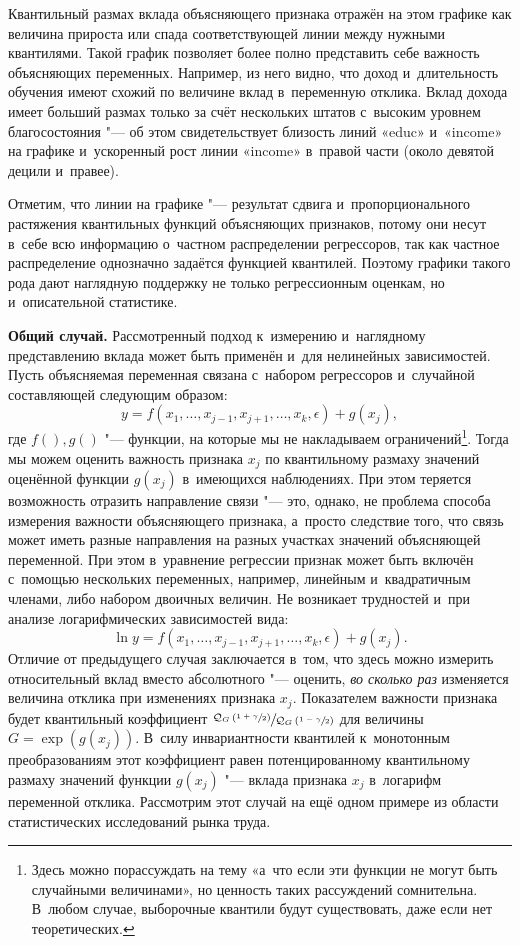\documentclass[11pt]{article}
\begin{document}
Квантильный размах вклада объясняющего признака отражён на этом графике как величина прироста или спада соответствующей линии между нужными квантилями. Такой график позволяет более полно представить себе важность объясняющих переменных. Например, из него видно, что доход и~длительность обучения имеют схожий по величине вклад в~переменную отклика. Вклад дохода имеет больший размах только за счёт нескольких штатов с~высоким уровнем благосостояния "--- об этом свидетельствует близость линий «educ» и~«income» на графике и~ускоренный рост линии «income» в~правой части (около девятой децили и~правее). 

Отметим, что линии на графике "--- результат сдвига и~пропорционального растяжения квантильных функций объясняющих признаков, потому они несут в~себе всю информацию о~частном распределении регрессоров, так как частное распределение однозначно задаётся функцией квантилей. Поэтому графики такого рода дают наглядную поддержку не только регрессионным оценкам, но и~описательной статистике.

{\bf Общий случай.} Рассмотренный подход к~измерению и~наглядному представлению вклада может быть применён и~для нелинейных зависимостей. Пусть объясняемая переменная связана с~набором регрессоров и~случайной составляющей следующим образом:
\begin{equation}\label{eq:1}
y = f(x_1,\ldots,x_{j-1},x_{j+1},\ldots, x_k, \epsilon) + g(x_j),
\end{equation}
где $f(), g()$ "--- функции, на которые мы не накладываем ограничений\footnote{Здесь можно порассуждать на тему «а~что если эти функции не могут быть случайными величинами», но ценность таких рассуждений сомнительна. В~любом случае, выборочные квантили будут существовать, даже если нет теоретических.}\fnnsp. Тогда мы можем оценить важность признака $x_j$ по квантильному размаху значений оценённой функции $g(x_j)$ в~имеющихся наблюдениях. При этом теряется возможность отразить направление связи "--- это, однако, не проблема способа измерения важности объясняющего признака, а~просто следствие того, что связь может иметь разные направления на разных участках значений объясняющей переменной. При этом в~уравнение регрессии признак может быть включён с~помощью нескольких переменных, например, линейным и~квадратичным членами, либо набором двоичных величин. Не возникает трудностей и~при анализе логарифмических зависимостей вида:
\begin{equation}\label{eq:2}
\ln y = f(x_1,\ldots,x_{j-1},x_{j+1},\ldots, x_k, \epsilon) + g(x_j).
\end{equation}
Отличие от предыдущего случая заключается в~том, что здесь можно измерить относительный вклад вместо абсолютного "--- оценить, {\it во сколько раз} изменяется величина отклика при изменениях признака $x_j$. Показателем важности признака будет квантильный коэффициент $\sfrac{\mathcal{Q}_G\left(\sfrac{1+\gamma}{2}\right)}{\mathcal{Q}_G\left(\sfrac{1-\gamma}{2}\right)}$ для величины $G = \exp(g(x_j))$. В~силу инвариантности квантилей к~монотонным преобразованиям этот коэффициент равен потенцированному квантильному размаху значений функции $g(x_j)$ "--- вклада признака $x_j$ в~логарифм переменной отклика. Рассмотрим этот случай на ещё одном примере из области статистических исследований рынка труда.
\end{document}
